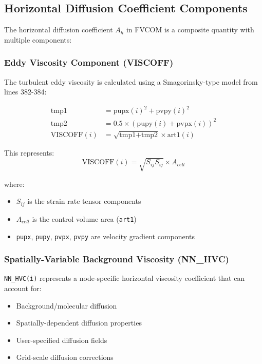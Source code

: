\documentclass[11pt,a4paper]{article}
\begin{document}
\subsection{Horizontal Diffusion Coefficient Components}

The horizontal diffusion coefficient $A_h$ in FVCOM is a composite quantity with multiple components:

\subsubsection{Eddy Viscosity Component (VISCOFF)}

The turbulent eddy viscosity is calculated using a Smagorinsky-type model from lines 382-384:

\begin{align}
\text{tmp1} &= \text{pupx}(i)^2 + \text{pvpy}(i)^2 \\
\text{tmp2} &= 0.5 \times (\text{pupy}(i) + \text{pvpx}(i))^2 \\
\text{VISCOFF}(i) &= \sqrt{\text{tmp1} + \text{tmp2}} \times \text{art1}(i)
\end{align}

This represents:
\begin{equation}
\text{VISCOFF}(i) = \sqrt{S_{ij} S_{ij}} \times A_{cell}
\end{equation}

where:
\begin{itemize}
\item $S_{ij}$ is the strain rate tensor components
\item $A_{cell}$ is the control volume area (\texttt{art1})
\item \texttt{pupx}, \texttt{pupy}, \texttt{pvpx}, \texttt{pvpy} are velocity gradient components
\end{itemize}

\subsubsection{Spatially-Variable Background Viscosity (NN\_HVC)}

\texttt{NN\_HVC(i)} represents a node-specific horizontal viscosity coefficient that can account for:
\begin{itemize}
\item Background/molecular diffusion
\item Spatially-dependent diffusion properties
\item User-specified diffusion fields
\item Grid-scale diffusion corrections
\end{itemize}
\end{document}
